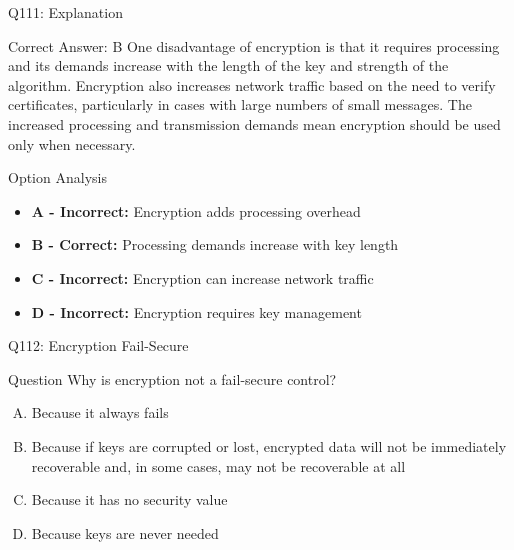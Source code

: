 \documentclass{beamer}
\begin{document}
	\begin{frame}{Q111: Explanation}
		\begin{block}{Correct Answer: B}
			One disadvantage of encryption is that it requires processing and its demands increase with the length of the key and strength of the algorithm. Encryption also increases network traffic based on the need to verify certificates, particularly in cases with large numbers of small messages. The increased processing and transmission demands mean encryption should be used only when necessary.
		\end{block}
		\begin{block}{Option Analysis}
			\begin{itemize}
				\item \textbf{A - Incorrect:} Encryption adds processing overhead
				\item \textbf{B - Correct:} Processing demands increase with key length
				\item \textbf{C - Incorrect:} Encryption can increase network traffic
				\item \textbf{D - Incorrect:} Encryption requires key management
			\end{itemize}
		\end{block}
	\end{frame}
	
	\begin{frame}{Q112: Encryption Fail-Secure}
		\begin{block}{Question}
			Why is encryption not a fail-secure control?
		\end{block}
		\begin{enumerate}[(A)]
			\item Because it always fails
			\item Because if keys are corrupted or lost, encrypted data will not be immediately recoverable and, in some cases, may not be recoverable at all
			\item Because it has no security value
			\item Because keys are never needed
		\end{enumerate}
	\end{frame}
	
\end{document}
